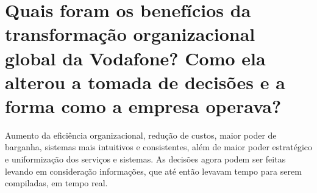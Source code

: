 \documentclass[12pt]{article}
\begin{document}
\section{Quais foram os benefícios da transformação organizacional global da Vodafone? Como ela alterou a tomada de decisões e a forma como a empresa operava?}
Aumento da eficiência organizacional, redução de custos, maior poder de barganha, sistemas mais intuitivos e consistentes, além de maior poder estratégico e uniformização dos serviços e sistemas. As decisões agora podem ser feitas levando em consideração informações, que até então levavam tempo para serem compiladas, em tempo real.

%
\end{document}
